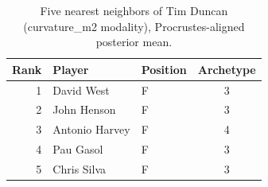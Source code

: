 \begin{table}[htbp]
  \centering\small
  \begin{tabular}{rllc}
    \toprule
    Rank & Player & Position & Archetype \\
    \midrule
    1 & David West & F & 3 \\
    2 & John Henson & F & 3 \\
    3 & Antonio Harvey & F & 4 \\
    4 & Pau Gasol & F & 3 \\
    5 & Chris Silva & F & 3 \\
    \bottomrule
  \end{tabular}
  \caption{Five nearest neighbors of Tim Duncan (curvature_m2 modality), Procrustes-aligned posterior mean.}
  \label{tab:Tim_Duncan_neighbors_curvature_m2}
\end{table}

